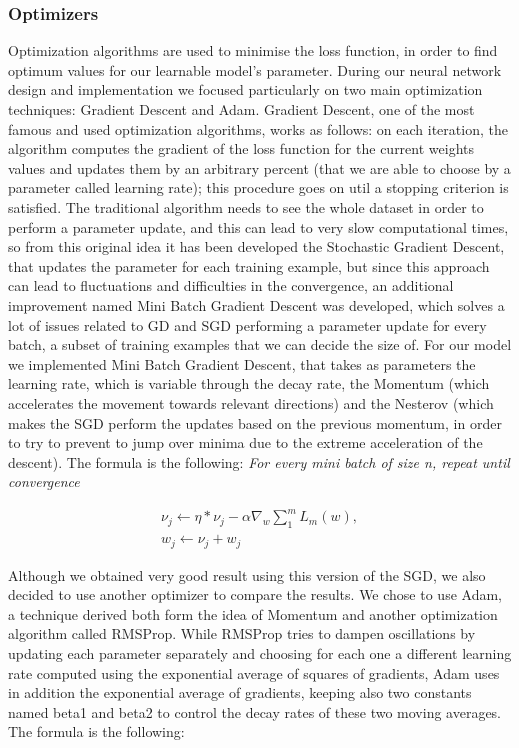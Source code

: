 \documentclass{article}
\begin{document}

\subsubsection{Optimizers}
Optimization algorithms are used to minimise the loss function, in order to find optimum values for our learnable model’s parameter. During our neural network design and implementation we focused particularly on two main optimization techniques: Gradient Descent and Adam. 
Gradient Descent, one of the most famous and used optimization algorithms, works as follows: on each iteration, the algorithm computes the gradient of the loss function for the current weights values and updates them by an arbitrary percent (that we are able to choose by a parameter called learning rate); this procedure goes on util a stopping criterion is satisfied. 
The traditional algorithm needs to see the whole dataset in order to perform a parameter update, and this can lead to very slow computational times, so from this original idea it has been developed the Stochastic Gradient Descent, that updates the parameter for each training example, but since this approach can lead to fluctuations and difficulties in the convergence, an additional improvement named Mini Batch Gradient Descent was developed, which solves a lot of issues related to GD and SGD performing a parameter update for every batch, a subset of training examples that we can decide the size of. 
For our model we implemented Mini Batch Gradient Descent, that takes as parameters the learning rate, which is variable through the decay rate, the Momentum (which accelerates the movement towards relevant directions) and the Nesterov (which makes the SGD perform the updates based on the previous momentum, in order to try to prevent to jump over minima due to the extreme acceleration of the descent).  
The formula is the following:
\textit{For every mini batch of size n, repeat until convergence}

\begin{align*}
\nu_{j}  \gets \eta  *  \nu_{j} - \alpha \nabla_{w} \sum_{1}^{m} L_{m}(w), \\
w_{j} \gets  \nu_{j} + w_{j}
\end{align*}

Although we obtained very good result using this version of the SGD, we also decided to use another optimizer to compare the results. We chose to use Adam, a technique derived both form the idea of Momentum and another optimization algorithm called RMSProp. 
While RMSProp tries to dampen oscillations by updating each parameter separately and choosing for each one a different learning rate computed using the exponential average of squares of gradients, Adam uses in addition the exponential average of gradients, keeping also two constants named beta1 and beta2 to control the decay rates of these two moving averages. 
The formula is the following:
\end{document}
